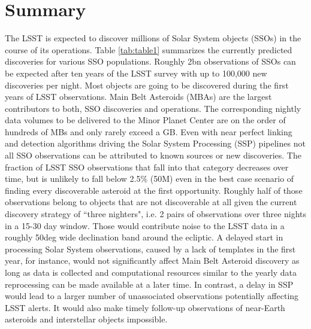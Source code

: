 \section{Summary} \label{sec:abstract}

The LSST is expected to discover millions of Solar System objects (SSOs) in the course of its operations. Table \ref{tab:table1} summarizes the currently predicted 
discoveries for various SSO populations. Roughly 2bn observations of SSOs can be expected after ten years of the LSST survey with up to 100,000 new discoveries per night. Most objects are going to be discovered during the first years of LSST observations. Main Belt Asteroids (MBAs) are the largest contributors to both, SSO discoveries and operations.
The corresponding nightly data volumes to be delivered to the Minor Planet Center are on the order of hundreds of MBs and only rarely exceed a GB.
Even with near perfect linking and detection algorithms driving the Solar System Processing (SSP) pipelines not all SSO observations can be attributed to known sources or new discoveries.
The fraction of LSST SSO observations that fall into that category decreases over time, but is unlikely to fall below 2.5\% (50M) even in the best case scenario of finding every discoverable asteroid at the first opportunity. Roughly half of those observations belong to objects that are not discoverable at all given the current discovery strategy of ``three nighters", i.e. 2 pairs of observations over three nights in a 15-30 day window. Those would contribute noise to the LSST data in a roughly 50deg wide declination band around the ecliptic. A delayed start in processing Solar System observations, caused by a lack of templates in the first year, for instance, would not significantly affect Main Belt Asteroid discovery as long as data is collected and computational resources similar to the yearly data reprocessing can be made available at a later time. In contrast, a delay in SSP would lead to a larger number of unassociated observations potentially affecting LSST alerts. It would also make timely follow-up observations of near-Earth asteroids and interstellar objects impossible. 

